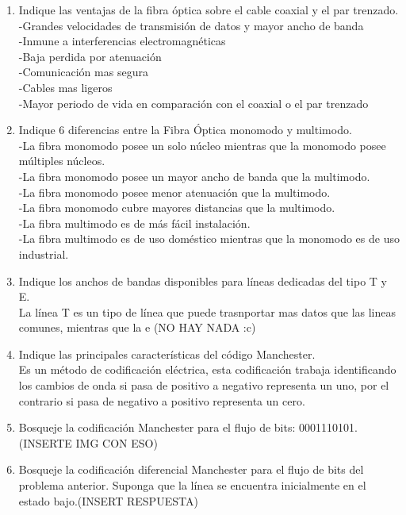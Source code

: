 \documentclass{udparticle}
\begin{document}
\begin{enumerate}
\item  Indique las ventajas de la fibra óptica sobre el cable coaxial y el par trenzado.\\
-Grandes velocidades de transmisión de datos y mayor ancho de banda\\
-Inmune a interferencias electromagnéticas\\
-Baja perdida por atenuación\\
-Comunicación mas segura\\
-Cables mas ligeros\\
-Mayor periodo de vida en comparación con el coaxial o el par trenzado\\
\item  Indique 6 diferencias entre la Fibra Óptica monomodo y multimodo.\\
-La fibra monomodo posee un solo núcleo mientras que la monomodo posee múltiples núcleos.\\
-La fibra monomodo posee un mayor ancho de banda que la multimodo.\\
-La fibra monomodo posee menor atenuación que la multimodo.\\
-La fibra monomodo cubre mayores distancias que la multimodo.\\
-La fibra multimodo es de más fácil instalación.\\
-La fibra multimodo es de uso doméstico mientras que la monomodo es de uso industrial.\\
\item Indique los anchos de bandas disponibles para líneas dedicadas del tipo T y E.\\
La línea T es un tipo de línea que puede trasnportar mas datos que las lineas comunes, mientras que la e (NO HAY NADA :c)\\
\item  Indique las principales características del código Manchester.\\
Es un método de codificación eléctrica, esta codificación trabaja identificando los cambios de onda si pasa de positivo a negativo representa un uno, por el contrario si pasa de negativo a positivo representa un cero.\\
\item Bosqueje la codificación Manchester para el ﬂujo de bits: 0001110101.(INSERTE IMG CON ESO)\\
\item  Bosqueje la codificación diferencial Manchester para el ﬂujo de bits del problema anterior. Suponga que la línea se encuentra inicialmente en el estado bajo.(INSERT RESPUESTA)\\

\end{enumerate}
\end{document}

